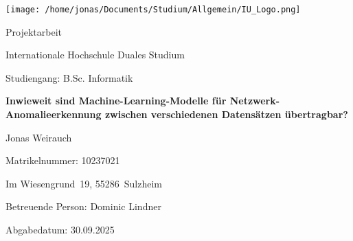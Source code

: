 \documentclass[11pt,a4paper]{article}
\newcommand{\university}{Internationale Hochschule Duales Studium}
\newcommand{\studyprogram}{B.Sc. Informatik}
\newcommand{\thesistype}{Projektarbeit}
\newcommand{\papertitle}{Inwieweit sind Machine-Learning-Modelle für Netzwerk-Anomalieerkennung zwischen verschiedenen Datensätzen übertragbar?}
\newcommand{\authorname}{Jonas Weirauch}
\newcommand{\matno}{10237021}
\newcommand{\address}{Im Wiesengrund 19, 55286 Sulzheim}
\newcommand{\advisor}{Dominic Lindner}
\newcommand{\submissiondate}{30.09.2025}
\begin{document}

    \setcounter{page}{1}
    \begin{titlepage}
        \thispagestyle{empty}
        \vspace*{-1cm}
        
        \begin{center}
            \texttt{[image: /home/jonas/Documents/Studium/Allgemein/IU\_Logo.png]}
        \end{center}
        
        \vspace{3cm}
        
        \begin{center}
            {\fontsize{11pt}{13pt}\selectfont \thesistype}
        \end{center}
        
        \vspace{2cm}
        
        \begin{center}
            {\fontsize{11pt}{13pt}\selectfont \university}
            
            \vspace{0.5cm}
            
            {\fontsize{11pt}{13pt}\selectfont Studiengang: \studyprogram}
        \end{center}
        
        \vspace{2cm}
        
        \begin{center}
            {\bfseries\fontsize{12pt}{14pt}\selectfont \papertitle}
        \end{center}
        
        \vspace{2cm}
        
        \begin{center}
            {\fontsize{11pt}{13pt}\selectfont \authorname}
            
            {\fontsize{11pt}{13pt}\selectfont Matrikelnummer: \matno}
            
            {\fontsize{11pt}{13pt}\selectfont \address}
        \end{center}
        
        \vspace{2cm}
        
        \begin{center}
            {\fontsize{11pt}{13pt}\selectfont Betreuende Person: \advisor}
            
            {\fontsize{11pt}{13pt}\selectfont Abgabedatum: \submissiondate}
        \end{center}
        
        \vfill
    \end{titlepage}
\end{document}
